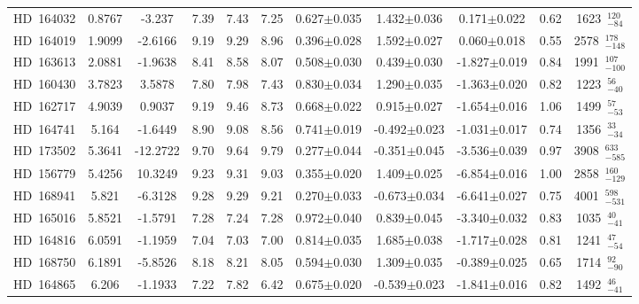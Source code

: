 {\begin{longtable}{lcccccccccc}
 \noalign{\smallskip}
 \hline
 \endfoot
 \noalign{\smallskip}
HD~164032 & 0.8767 & -3.237 & 7.39 & 7.43 & 7.25 & 0.627$\pm$0.035 & 1.432$\pm$0.036 & 0.171$\pm$0.022 & 0.62 & 1623~$_{-84}^{120}$ \\
\noalign{\smallskip}
HD~164019 & 1.9099 & -2.6166 & 9.19 & 9.29 & 8.96 & 0.396$\pm$0.028 & 1.592$\pm$0.027 & 0.060$\pm$0.018 & 0.55 & 2578~$_{-148}^{178}$ \\
\noalign{\smallskip}
HD~163613 & 2.0881 & -1.9638 & 8.41 & 8.58 & 8.07 & 0.508$\pm$0.030 & 0.439$\pm$0.030 & -1.827$\pm$0.019 & 0.84 & 1991~$_{-100}^{107}$ \\
\noalign{\smallskip}
HD~160430 & 3.7823 & 3.5878 & 7.80 & 7.98 & 7.43 & 0.830$\pm$0.034 & 1.290$\pm$0.035 & -1.363$\pm$0.020 & 0.82 & 1223~$_{-40}^{56}$ \\
\noalign{\smallskip}
HD~162717 & 4.9039 & 0.9037 & 9.19 & 9.46 & 8.73 & 0.668$\pm$0.022 & 0.915$\pm$0.027 & -1.654$\pm$0.016 & 1.06 & 1499~$_{-53}^{57}$ \\
\noalign{\smallskip}
HD~164741 & 5.164 & -1.6449 & 8.90 & 9.08 & 8.56 & 0.741$\pm$0.019 & -0.492$\pm$0.023 & -1.031$\pm$0.017 & 0.74 & 1356~$_{-34}^{33}$ \\
\noalign{\smallskip}
HD~173502 & 5.3641 & -12.2722 & 9.70 & 9.64 & 9.79 & 0.277$\pm$0.044 & -0.351$\pm$0.045 & -3.536$\pm$0.039 & 0.97 & 3908~$_{-585}^{633}$ \\
\noalign{\smallskip}
HD~156779 & 5.4256 & 10.3249 & 9.23 & 9.31 & 9.03 & 0.355$\pm$0.020 & 1.409$\pm$0.025 & -6.854$\pm$0.016 & 1.00 & 2858~$_{-129}^{160}$ \\
\noalign{\smallskip}
HD~168941 & 5.821 & -6.3128 & 9.28 & 9.29 & 9.21 & 0.270$\pm$0.033 & -0.673$\pm$0.034 & -6.641$\pm$0.027 & 0.75 & 4001~$_{-531}^{598}$ \\
\noalign{\smallskip}
HD~165016 & 5.8521 & -1.5791 & 7.28 & 7.24 & 7.28 & 0.972$\pm$0.040 & 0.839$\pm$0.045 & -3.340$\pm$0.032 & 0.83 & 1035~$_{-41}^{40}$ \\
\noalign{\smallskip}
HD~164816 & 6.0591 & -1.1959 & 7.04 & 7.03 & 7.00 & 0.814$\pm$0.035 & 1.685$\pm$0.038 & -1.717$\pm$0.028 & 0.81 & 1241~$_{-54}^{47}$ \\
\noalign{\smallskip}
HD~168750 & 6.1891 & -5.8526 & 8.18 & 8.21 & 8.05 & 0.594$\pm$0.030 & 1.309$\pm$0.035 & -0.389$\pm$0.025 & 0.65 & 1714~$_{-90}^{92}$ \\
\noalign{\smallskip}
HD~164865 & 6.206 & -1.1933 & 7.22 & 7.82 & 6.42 & 0.675$\pm$0.020 & -0.539$\pm$0.023 & -1.841$\pm$0.016 & 0.82 & 1492~$_{-41}^{46}$ \\

\end{longtable}}
